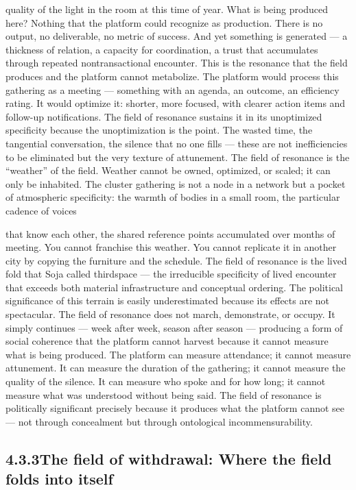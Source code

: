quality of the light in the room at this time of year. What is being produced here? Nothing that the platform could recognize as production. There is no output, no deliverable, no metric of success. And yet something is generated — a thickness of relation, a capacity for coordination, a trust that accumulates through repeated nontransactional encounter. This is the resonance that the field produces and the platform cannot metabolize. The platform would process this gathering as a meeting — something with an agenda, an outcome, an efficiency rating. It would optimize it: shorter, more focused, with clearer action items and follow-up notifications. The field of resonance sustains it in its unoptimized specificity because the unoptimization is the point. The wasted time, the tangential conversation, the silence that no one fills — these are not inefficiencies to be eliminated but the very texture of attunement. The field of resonance is the “weather” of the field. Weather cannot be owned, optimized, or scaled; it can only be inhabited. The cluster gathering is not a node in a network but a pocket of atmospheric specificity: the warmth of bodies in a small room, the particular cadence of voices

that know each other, the shared reference points accumulated over months of meeting. You cannot franchise this weather. You cannot replicate it in another city by copying the furniture and the schedule. The field of resonance is the lived fold that Soja called thirdspace — the irreducible specificity of lived encounter that exceeds both material infrastructure and conceptual ordering. The political significance of this terrain is easily underestimated because its effects are not spectacular. The field of resonance does not march, demonstrate, or occupy. It simply continues — week after week, season after season — producing a form of social coherence that the platform cannot harvest because it cannot measure what is being produced. The platform can measure attendance; it cannot measure attunement. It can measure the duration of the gathering; it cannot measure the quality of the silence. It can measure who spoke and for how long; it cannot measure what was understood without being said. The field of resonance is politically significant precisely because it produces what the platform cannot see — not through concealment but through ontological incommensurability.

\subsection{4.3.3\quad The field of withdrawal: Where the field folds into itself}

